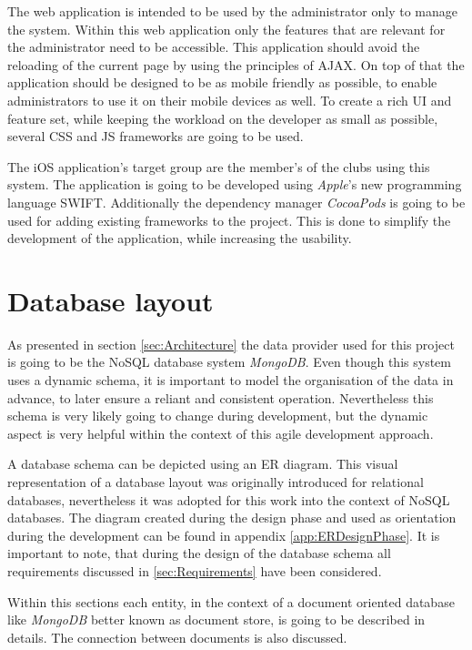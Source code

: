 The web application is intended to be used by the administrator only to manage the system. Within this web application only the features that are relevant for the administrator need to be accessible. This application should avoid the reloading of the current page by using the principles of \gls{AJAX}. On top of that the application should be designed to be as mobile friendly as possible, to enable administrators to use it on their mobile devices as well. To create a rich \gls{UI} and feature set, while keeping the workload on the developer as small as possible, several \gls{CSS} and \gls{JS} frameworks are going to be used.

The iOS application's target group are the member's of the clubs using this system. The application is going to be developed using \emph{Apple}'s new programming language \gls{SWIFT}. Additionally the dependency manager \emph{CocoaPods} is going to be used for adding existing frameworks to the project. This is done to simplify the development of the application, while increasing the usability.

\section{Database layout}

As presented in section \vref{sec:Architecture} the data provider used for this project is going to be the \gls{NoSQL} database system \emph{MongoDB}. Even though this system uses a dynamic schema, it is important to model the organisation of the data in advance, to later ensure a reliant and consistent operation. Nevertheless this schema is very likely going to change during development, but the dynamic aspect is very helpful within the context of this agile development approach.

A database schema can be depicted using an \gls{ER} diagram. This visual representation of a database layout was originally introduced for relational databases, nevertheless it was adopted for this work into the context of \gls{NoSQL} databases. The diagram created during the design phase and used as orientation during the development can be found in appendix \vref{app:ERDesignPhase}. It is important to note, that during the design of the database schema all requirements discussed in \vref{sec:Requirements} have been considered.

Within this sections each entity, in the context of a document oriented database like \emph{MongoDB} better known as document store, is going to be described in details. The connection between documents is also discussed.

